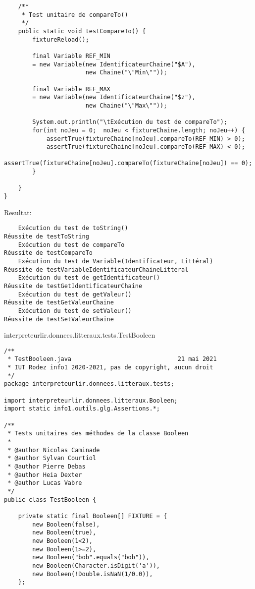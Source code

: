 \begin{enum}
\begin{verbatim}
    /** 
     * Test unitaire de compareTo()
     */
    public static void testCompareTo() {
        fixtureReload();
        
        final Variable REF_MIN
        = new Variable(new IdentificateurChaine("$A"),
                       new Chaine("\"Min\""));
        
        final Variable REF_MAX
        = new Variable(new IdentificateurChaine("$z"),
                       new Chaine("\"Max\""));

        System.out.println("\tExécution du test de compareTo");
        for(int noJeu = 0;  noJeu < fixtureChaine.length; noJeu++) {
            assertTrue(fixtureChaine[noJeu].compareTo(REF_MIN) > 0);
            assertTrue(fixtureChaine[noJeu].compareTo(REF_MAX) < 0);
            assertTrue(fixtureChaine[noJeu].compareTo(fixtureChaine[noJeu]) == 0);
        }
        
    }
}
\end{verbatim}
Resultat:
\begin{verbatim}
    Exécution du test de toString()
Réussite de testToString
    Exécution du test de compareTo
Réussite de testCompareTo
    Exécution du test de Variable(Identificateur, Littéral)
Réussite de testVariableIdentificateurChaineLitteral
    Exécution du test de getIdentificateur()
Réussite de testGetIdentificateurChaine
    Exécution du test de getValeur()
Réussite de testGetValeurChaine
    Exécution du test de setValeur()
Réussite de testSetValeurChaine
\end{verbatim}

    \item interpreteurlir.donnees.litteraux.tests.TestBooleen
\begin{verbatim}
/**
 * TestBooleen.java                              21 mai 2021
 * IUT Rodez info1 2020-2021, pas de copyright, aucun droit
 */
package interpreteurlir.donnees.litteraux.tests;

import interpreteurlir.donnees.litteraux.Booleen;
import static info1.outils.glg.Assertions.*;

/** 
 * Tests unitaires des méthodes de la classe Booleen
 * 
 * @author Nicolas Caminade
 * @author Sylvan Courtiol
 * @author Pierre Debas
 * @author Heia Dexter
 * @author Lucas Vabre
 */
public class TestBooleen {
    
    private static final Booleen[] FIXTURE = {
        new Booleen(false),
        new Booleen(true),
        new Booleen(1<2),
        new Booleen(1>=2),
        new Booleen("bob".equals("bob")),
        new Booleen(Character.isDigit('a')),
        new Booleen(!Double.isNaN(1/0.0)),
    };
    

\end{verbatim}
\end{enum}
